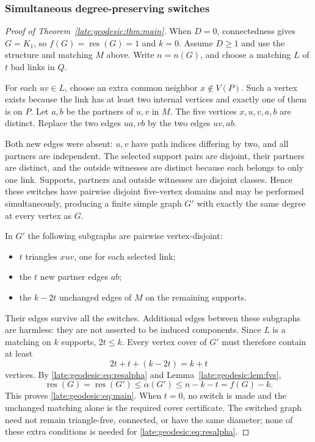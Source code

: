 \documentclass[11pt,a4paper]{article}
\theoremstyle{definition}\newtheorem{definition}[theorem]{Definition}
\theoremstyle{remark}\newtheorem{remark}[theorem]{Remark}
\newcommand{\res}{\operatorname{res}}
\begin{document}
\subsubsection{Simultaneous degree-preserving switches}
\begin{proof}[Proof of Theorem~\ref{late:geodesic:thm:main}]
When $D=0$, connectedness gives $G=K_1$, so $f(G)=\res(G)=1$ and $k=0$.
Assume $D\ge1$ and use the structure and matching $M$ above. Write
$n=n(G)$, and choose a matching $L$ of $t$ bad links in $Q$.

For each $uv\in L$, choose an extra common neighbor $x\notin V(P)$.
Such a vertex exists because the link has at least two internal vertices
and exactly one of them is on $P$. Let $a,b$ be the partners of $u,v$ in
$M$. The five vertices $x,u,v,a,b$ are distinct. Replace the two edges
$ua,vb$ by the two edges $uv,ab$.

Both new edges were absent: $u,v$ have path indices differing by two,
and all partners are independent. The selected support pairs are
disjoint, their partners are distinct, and the outside witnesses are
distinct because each belongs to only one link. Supports, partners and
outside witnesses are disjoint classes. Hence these switches have
pairwise disjoint five-vertex domains and may be performed simultaneously,
producing a finite simple graph $G'$ with exactly the same degree at
every vertex as $G$.

In $G'$ the following subgraphs are pairwise vertex-disjoint:
\begin{itemize}
\item $t$ triangles $xuv$, one for each selected link;
\item the $t$ new partner edges $ab$;
\item the $k-2t$ unchanged edges of $M$ on the remaining supports.
\end{itemize}
Their edges survive all the switches. Additional edges between these
subgraphs are harmless: they are not asserted to be induced components.
Since $L$ is a matching on $k$ supports, $2t\le k$. Every vertex cover
of $G'$ must therefore contain at least
\[
 2t+t+(k-2t)=k+t
\]
vertices. By \eqref{late:geodesic:eq:resalpha} and Lemma~\ref{late:geodesic:lem:fvs},
\[
 \res(G)=\res(G')\le\alpha(G')\le n-k-t=f(G)-k.
\]
This proves \eqref{late:geodesic:eq:main}. When $t=0$, no switch is made and the unchanged
matching alone is the required cover certificate. The switched graph
need not remain triangle-free, connected, or have the same diameter;
none of these extra conditions is needed for \eqref{late:geodesic:eq:resalpha}.
\end{proof}
\end{document}
